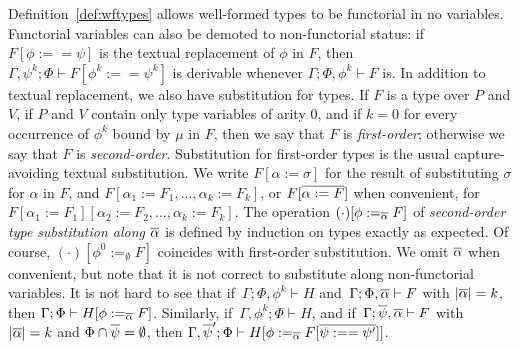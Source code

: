 \documentclass[runningheads]{llncs}
\begin{document}
Definition~\ref{def:wftypes} allows well-formed types to be functorial
in no variables. Functorial variables can also be demoted to
non-functorial status: if $F[\phi :== \psi]$ is the textual
replacement of $\phi$ in $F$, then $\Gamma, \psi^k; \Phi \vdash
F[\phi^k :== \psi^k]$ is derivable whenever $\Gamma; \Phi, \phi^k
\vdash F$ is.  In addition to textual replacement, we also have
substitution for types. If $F$ is a type over $P$ and $V$, if $P$
and $V$ contain only type variables of arity $0$, and if $k=0$ for
every occurrence of $\phi^k$ bound by $\mu$ in $F$, then we say that
$F$ is {\em first-order}; otherwise we say that $F$ is {\em
  second-order}.  Substitution for first-order types is the usual
capture-avoiding textual substitution. We write $F[\alpha := \sigma]$
for the result of substituting $\sigma$ for $\alpha$ in $F$, and
$F[\alpha_1 := F_1,...,\alpha_k := F_k]$, or $F[\overline{\alpha := F}]$
when convenient, for $F[\alpha_1 := F_1][\alpha_2 := F_2,...,\alpha_k
  := F_k]$. The operation $(\cdot)[\phi :=_{\overline{\alpha}} F]$ of {\em
  second-order type substitution along $\overline{\alpha}$} is defined by
induction on types exactly as expected.
Of course, $(\cdot)[\phi^0 :=_\emptyset F]$ coincides with
first-order substitution. We omit $\overline{\alpha}$ when convenient, but
note that it is not correct to substitute along non-functorial
variables. It is not hard to see that if \,$\Gamma; \Phi,\phi^k
\vdash H$ and\, $\Gamma;\Phi, \overline{\alpha} \vdash F$ with $|\overline{\alpha}|
= k$, then $\Gamma;\Phi \vdash H[\phi :=_{\overline{\alpha}} F]$.
Similarly, if \,$\Gamma, \phi^k; \Phi \vdash H$, and if\, $\Gamma;
\overline{\psi},\overline{\alpha} \vdash F$ with $|\overline{\alpha}| = k$ and $\Phi \cap
\overline{\psi} = \emptyset$, then $\Gamma,\overline{\psi}';\Phi \vdash H[\phi
  :=_{\overline{\alpha}} F[\overline{\psi :== \psi'}]]$.
\end{document}

